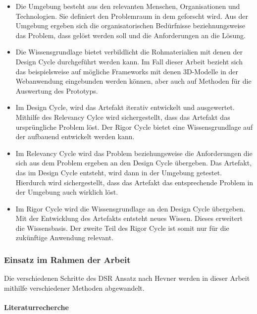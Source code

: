 \begin{itemize}
    \item Die Umgebung besteht aus den relevanten Menschen, Organisationen und Technologien. Sie definiert den Problemraum in dem geforscht wird. Aus der Umgebung ergeben sich die organisatorischen Bedürfnisse beziehnungsweise das Problem, dass gelöst werden soll und die Anforderungen an die Lösung.
    \item Die Wissensgrundlage bietet verbildlicht die Rohmaterialien mit denen der Design Cycle durchgeführt werden kann. Im Fall dieser Arbeit bezieht sich das beispielsweise auf mögliche Frameworks mit denen 3D-Modelle in der Webanwendung eingebunden werden können, aber auch auf Methoden für die Auswertung des Prototyps.
    \item Im Design Cycle, wird das Artefakt iterativ entwickelt und ausgewertet. Mithilfe des Relevancy Cylce wird sichergestellt, dass das Artefakt das ursprüngliche Problem löst. Der Rigor Cycle bietet eine Wissensgrundlage auf der aufbauend entwickelt werden kann.
    \item Im Relevancy Cycle wird das Problem beziehungsweise die Anforderungen die sich aus dem Problem ergeben an den Design Cycle übergeben. Das Artefakt, das im Design Cycle entsteht, wird dann in der Umgebung getestet. Hierdurch wird sichergestellt, dass das Artefakt das entsprechende Problem in der Umgebung auch wirklich löst.
    \item Im Rigor Cycle wird die Wissensgrundlage an den Design Cycle übergeben. Mit der Entwicklung des Artefakts entsteht neues Wissen. Dieses erweitert die Wissensbasis. Der zweite Teil des Rigor Cycle ist somit nur für die zukünftige Anwendung relevant.
\end{itemize}

\subsubsection{Einsatz im Rahmen der Arbeit}

Die verschiedenen Schritte des \ac{DSR} Ansatz nach Hevner werden in dieser Arbeit mithilfe verschiedener Methoden abgewandelt.

\paragraph{Literaturrecherche}

